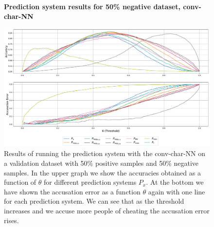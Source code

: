 \begin{figure}
    \centering
    \textbf{Prediction system results for 50\% negative dataset, \gls{conv-char-NN}}\par\medskip
    \includegraphics[scale=0.33]{./pictures/experiments/conv_char_nn/prediction_system_50}
    \caption{Results of running the prediction system with the
        \gls{conv-char-NN} on a validation dataset with 50\% positive samples
        and 50\% negative samples. In the upper graph we show the accuracies
        obtained as a function of $\theta$ for different prediction systems
        $P_x$. At the bottom we have shown the accusation error as a function
        $\theta$ again with one line for each prediction system. We can see that
        as the threshold increases and we accuse more people of cheating the
        accusation error rises.}
    \label{fig:conv-char-NN-pred-50}
\end{figure}

